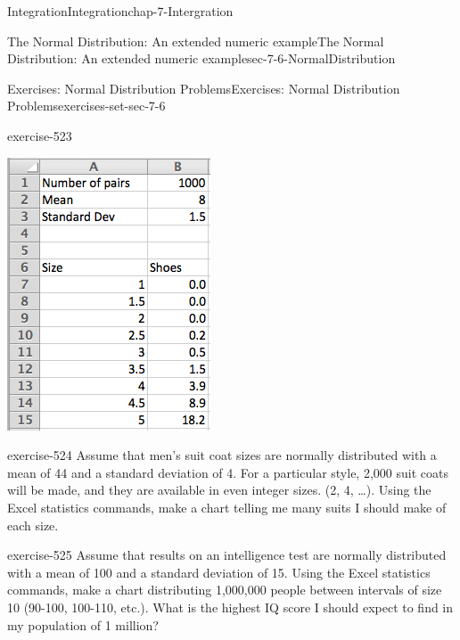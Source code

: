 \documentclass[oneside,10pt,]{book}
\numberwithin{equation}{section}
\begin{document}
\begin{chapterptx}{Integration}{}{Integration}{}{}{chap-7-Intergration}
\begin{sectionptx}{The Normal Distribution: An extended numeric example}{}{The Normal Distribution: An extended numeric example}{}{}{sec-7-6-NormalDistribution}
\begin{exercises-subsection-numberless}{Exercises: Normal Distribution Problems}{}{Exercises: Normal Distribution Problems}{}{}{exercises-set-sec-7-6}
\begin{divisionexercise}{7}{}{}{exercise-523}
\begin{sidebyside}{1}{0.3}{0.3}{0}
\begin{sbspanel}{0.4}
\includegraphics[width=1\linewidth]{images/sec7-6-sol7b.png}
\end{sbspanel}%
\end{sidebyside}%
\end{divisionexercise}%
\begin{divisionexercise}{8}{}{}{exercise-524}%
\hypertarget{p-2989}{}%
Assume that men’s suit coat sizes are normally distributed with a mean of 44 and a standard deviation of 4.  For a particular style, 2,000 suit coats will be made, and they are available in even integer sizes.  (2, 4, …). Using the Excel statistics commands, make a chart telling me many suits I should make of each size.%
\end{divisionexercise}%
\begin{divisionexercise}{9}{}{}{exercise-525}%
\hypertarget{p-2990}{}%
Assume that results on an intelligence test are normally distributed with a mean of 100 and a standard deviation of 15.  Using the Excel statistics commands, make a chart distributing 1,000,000 people between intervals of size 10 (90-100, 100-110, etc.).  What is the highest IQ score I should expect to find in my population of 1 million?%

\end{divisionexercise}
\end{exercises-subsection-numberless}
\end{sectionptx}
\end{chapterptx}
\end{document}
